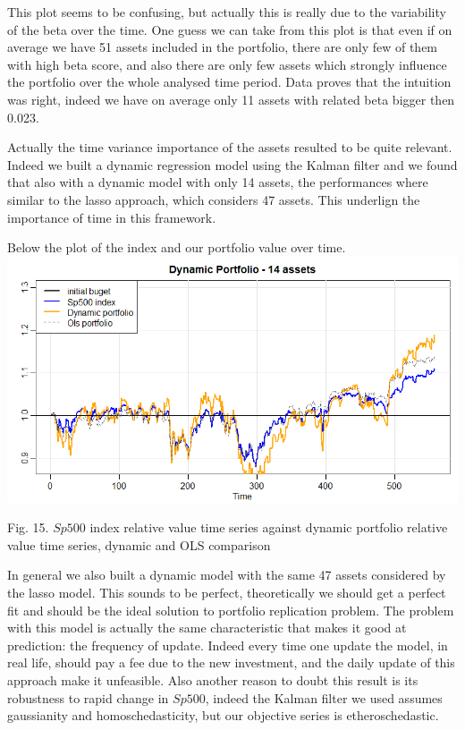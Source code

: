 \documentclass{article}%
\begin{document}
This plot seems to be confusing, but actually this is really due to the variability of the beta over the time. One guess we can take from this plot is that even if on average we have 51 assets included in the portfolio, there are only few of them with high beta score, and also there are only few assets which strongly influence the portfolio over the whole analysed time period. Data proves that the intuition was right, indeed we have on average only 11 assets with related beta bigger then 0.023. 

Actually the time variance importance of the assets resulted to be quite relevant. Indeed we built a dynamic regression model using the Kalman filter and we found that also with a dynamic model with only 14 assets, the performances where similar to the lasso approach, which considers 47 assets. This underlign the importance of time in this framework.

Below the plot of the index and our portfolio value over time.
\\

\includegraphics[scale=0.55]{dynamic14}
\begin{center}
\begin{small}
Fig. 15. $Sp500$ index relative value time series against dynamic portfolio relative value time series, dynamic and OLS comparison
\\

\end{small}
\end{center}


In general we also built a dynamic model with the same 47 assets considered by the lasso model. This sounds to be perfect, theoretically we should get a perfect fit and should be the ideal solution to portfolio replication problem. The problem with this model is actually the same characteristic that makes it  good at prediction: the frequency of update. Indeed every time one update the model, in real life, should pay a fee due to the new investment, and the daily update of this approach make it unfeasible. Also another reason to doubt this result is its robustness to rapid change in $Sp500$, indeed the Kalman filter we used assumes gaussianity and homoschedasticity, but our objective series is etheroschedastic.  
\end{document}
